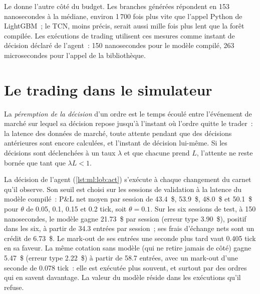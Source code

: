 Le  donne l'autre côté du budget. Les branches générées répondent en 153 nanosecondes à la médiane, environ
1\,700 fois plus vite que l'appel Python de LightGBM~; le TCN, moins précis, serait aussi mille fois plus lent que la
forêt compilée. Les exécutions de trading utilisent ces mesures comme instant de décision déclaré de l'agent~: 150 nanosecondes pour le modèle compilé,
263 microsecondes pour l'appel de la bibliothèque.

\section{Le trading dans le simulateur}

\begin{definition}\label{def:ml:build-an-order-book-model-end-to-end:staleness}
La \emph{péremption de la décision} d'un ordre est le temps écoulé entre l'événement de marché sur lequel sa décision repose jusqu'à
l'instant où l'ordre quitte le trader~: la latence des données de marché, toute attente pendant que des décisions antérieures sont encore calculées, et
l'instant de décision lui-même. Si les décisions sont déclenchées à un taux $\lambda$ et que chacune prend $L$, l'attente ne reste bornée que tant que
$\lambda L<1$.
\end{definition}

La décision de l'agent (\cref{lst:ml:lob:act}) s'exécute à chaque changement du carnet qu'il observe. Son seuil est choisi sur les sessions de validation
à la latence du modèle compilé~: P\&L net moyen par session de 43.4~\$, 53.9~\$, 48.0~\$ et 50.1~\$ pour $\theta$ de 0.05, 0.1, 0.15 et
0.2 tick, soit $\theta=0.1$. Sur les six sessions de test, à 150 nanosecondes, le modèle gagne 21.73~\$ par session (erreur type
3.90~\$), positif dans les six, à partir de 34.3 entrées par session~; ses frais d'échange nets sont un crédit de 6.73~\$. Le mark-out de ses entrées une seconde
plus tard vaut 0.405 tick en sa faveur. La même cotation sans modèle (qui ne retire jamais de côté) gagne 5.47~\$ (erreur type
2.22~\$) à partir de 58.7 entrées, avec un mark-out d'une seconde de 0.078 tick~: elle est exécutée plus souvent, et surtout par des ordres qui en savent
davantage. La valeur du modèle réside dans les exécutions qu'il refuse.

